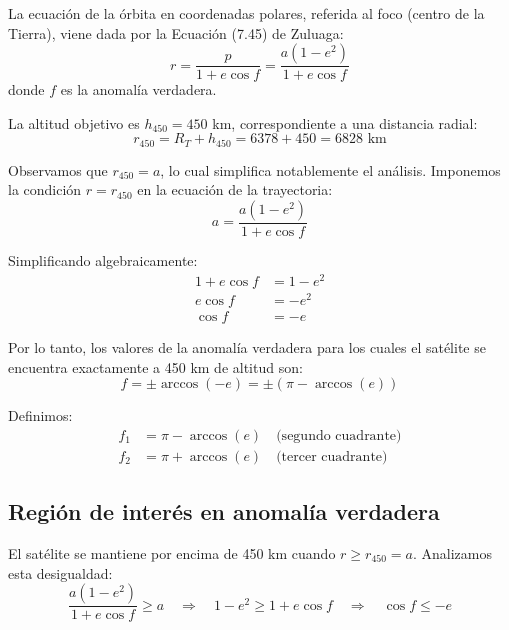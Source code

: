\documentclass[12pt, a4paper]{article}
\begin{document}
La ecuación de la órbita en coordenadas polares, referida al foco (centro de la Tierra), viene dada por la Ecuación (7.45) de Zuluaga:
\begin{equation}
    r = \frac{p}{1 + e\cos f} = \frac{a(1-e^2)}{1 + e\cos f}
\end{equation}
donde $f$ es la anomalía verdadera.

La altitud objetivo es $h_{450} = 450$ km, correspondiente a una distancia radial:
\begin{equation}
    r_{450} = R_T + h_{450} = 6378 + 450 = 6828 \text{ km}
\end{equation}

Observamos que $r_{450} = a$, lo cual simplifica notablemente el análisis. Imponemos la condición $r = r_{450}$ en la ecuación de la trayectoria:
\begin{equation}
    a = \frac{a(1-e^2)}{1 + e\cos f}
\end{equation}

Simplificando algebraicamente:
\begin{align}
    1 + e\cos f &= 1 - e^2 \\
    e\cos f &= -e^2 \\
    \cos f &= -e
\end{align}

Por lo tanto, los valores de la anomalía verdadera para los cuales el satélite se encuentra exactamente a 450 km de altitud son:
\begin{equation}
    f = \pm \arccos(-e) = \pm (\pi - \arccos(e))
\end{equation}

Definimos:
\begin{align}
    f_1 &= \pi - \arccos(e) \quad \text{(segundo cuadrante)} \\
    f_2 &= \pi + \arccos(e) \quad \text{(tercer cuadrante)}
\end{align}

\subsection*{Región de interés en anomalía verdadera}

El satélite se mantiene por encima de 450 km cuando $r \geq r_{450} = a$. Analizamos esta desigualdad:
\begin{equation}
    \frac{a(1-e^2)}{1 + e\cos f} \geq a \quad \Rightarrow \quad 1 - e^2 \geq 1 + e\cos f \quad \Rightarrow \quad \cos f \leq -e
\end{equation}
\end{document}
